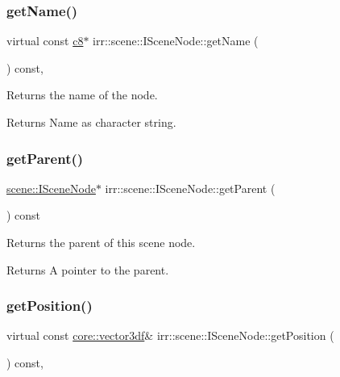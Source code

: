 \subsubsection{\texorpdfstring{get\+Name()}{getName()}}
{\footnotesize\ttfamily virtual const \hyperlink{namespaceirr_a9395eaea339bcb546b319e9c96bf7410}{c8}$\ast$ irr\+::scene\+::\+I\+Scene\+Node\+::get\+Name (\begin{DoxyParamCaption}{ }\end{DoxyParamCaption}) const\hspace{0.3cm}{\ttfamily [inline]}, {\ttfamily [virtual]}}



Returns the name of the node. 

\begin{DoxyReturn}{Returns}
Name as character string. 
\end{DoxyReturn}
\mbox{\label{classirr_1_1scene_1_1ISceneNode_adf77e3715d63e436cc691bf881c4eb5b}} 
\subsubsection{\texorpdfstring{get\+Parent()}{getParent()}}
{\footnotesize\ttfamily \hyperlink{classirr_1_1scene_1_1ISceneNode}{scene\+::\+I\+Scene\+Node}$\ast$ irr\+::scene\+::\+I\+Scene\+Node\+::get\+Parent (\begin{DoxyParamCaption}{ }\end{DoxyParamCaption}) const\hspace{0.3cm}{\ttfamily [inline]}}



Returns the parent of this scene node. 

\begin{DoxyReturn}{Returns}
A pointer to the parent. 
\end{DoxyReturn}
\mbox{\label{classirr_1_1scene_1_1ISceneNode_af5686d35e868e7d295c2d2cb84799d20}} 
\subsubsection{\texorpdfstring{get\+Position()}{getPosition()}}
{\footnotesize\ttfamily virtual const \hyperlink{namespaceirr_1_1core_a06f169d08b5c429f5575acb7edbad811}{core\+::vector3df}\& irr\+::scene\+::\+I\+Scene\+Node\+::get\+Position (\begin{DoxyParamCaption}{ }\end{DoxyParamCaption}) const\hspace{0.3cm}{\ttfamily [inline]}, {\ttfamily [virtual]}}



